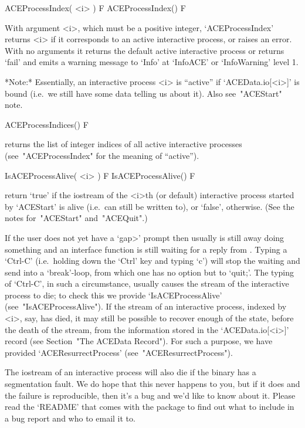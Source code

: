 
\>ACEProcessIndex( <i> ) F
\>ACEProcessIndex() F

With argument <i>, which must be a positive integer, `ACEProcessIndex'
returns <i> if it corresponds to an  active  interactive  process,  or
raises an error. With no  arguments  it  returns  the  default  active
interactive process or returns `fail' and emits a warning  message  to
`Info' at `InfoACE' or `InfoWarning' level 1.

*Note:*
Essentially, an  interactive  {\ACE}  process  <i>  is  ``active''  if
`ACEData.io[<i>]' is bound (i.e.~we still have some  data  telling  us
about it). Also see~"ACEStart" note.

\>ACEProcessIndices() F

returns the list of integer indices of all active  interactive  {\ACE}
processes (see~"ACEProcessIndex" for the meaning of ``active'').

\>IsACEProcessAlive( <i> ) F
\>IsACEProcessAlive() F

return `true' if  the  {\GAP}  iostream  of  the  <i>th  (or  default)
interactive {\ACE} process started by `ACEStart'  is  alive  (i.e.~can
still  be  written  to),  or  `false',  otherwise.  (See   the   notes
for~"ACEStart" and~"ACEQuit".)

If the user does not yet have a `gap>' prompt then usually  {\ACE}  is
still away doing something and an {\ACE} interface function  is  still
waiting for a reply from {\ACE}. Typing a `Ctrl-C' (i.e.~holding  down
the `Ctrl' key and typing `c') will stop the waiting and  send  {\GAP}
into a `break'-loop, from which one has no option but to `quit;'.  The
typing of `Ctrl-C', in such a circumstance, usually causes the  stream
of the interactive {\ACE} process to die; to  check  this  we  provide
`IsACEProcessAlive' (see~"IsACEProcessAlive"). If  the  stream  of  an
interactive {\ACE} process, indexed by <i>,  say,  has  died,  it  may
still be possible to recover enough of the state, before the death  of
the stream, from  the  information  stored  in  the  `ACEData.io[<i>]'
record (see Section~"The ACEData Record"). For such a purpose, we have
provided `ACEResurrectProcess' (see~"ACEResurrectProcess").

The {\GAP} iostream of an interactive {\ACE} process will also die  if
the {\ACE} binary has a segmentation fault. We do hope that this never
happens to you, but if it does and the failure is  reproducible,  then
it's a bug and we'd like to know about it. Please  read  the  `README'
that comes with the {\ACE} package to find out what to  include  in  a
bug report and who to email it to.

